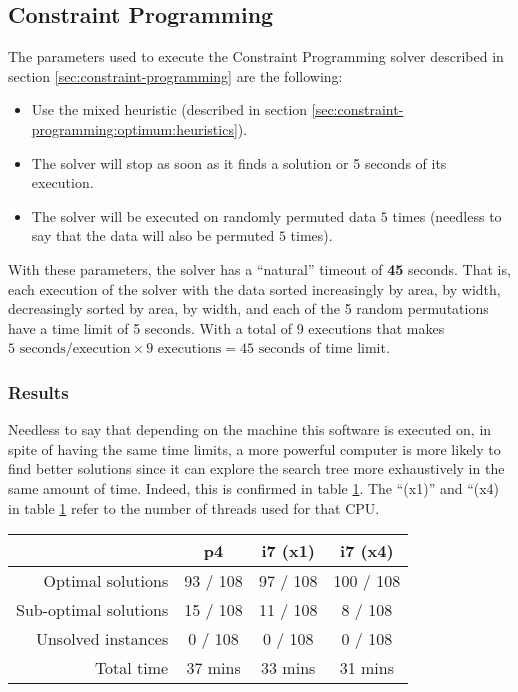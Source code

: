 \subsection{Constraint Programming}
\label{sec:benchmarking:constraint-programming}

The parameters used to execute the Constraint Programming solver described in section
\ref{sec:constraint-programming} are the following:
\begin{itemize}
	\item Use the mixed heuristic (described in section \ref{sec:constraint-programming:optimum:heuristics}).
	\item The solver will stop as soon as it finds a solution or 5 seconds of its execution.
	\item The solver will be executed on randomly permuted data $5$ times (needless to
	say that the data will also be permuted $5$ times).
\end{itemize}

With these parameters, the solver has a ``natural'' timeout of \textbf{45} seconds.
That is, each execution of the solver with the data sorted increasingly by area, by
width, decreasingly sorted by area, by width, and each of the 5 random permutations
have a time limit of 5 seconds. With a total of 9 executions that makes
$5 \text{ seconds/execution} \times 9 \text{ executions} = 45 \text{ seconds}$ of time limit.

\subsubsection{Results}
\label{sec:benchmarking:constraint-programming:results}

Needless to say that depending on the machine this software is executed on,
in spite of having the same time limits, a more powerful computer is more likely
to find better solutions since it can explore the search tree more exhaustively
in the same amount of time. Indeed, this is confirmed in table \ref{table:CP-results}.
The ``(x1)'' and ``(x4) in table \ref{table:CP-results} refer to the number of threads
used for that CPU.

\begin{table}[H]
\centering
	\begin{tabular}{rccc}
								& p4			& i7 (x1)	& i7 (x4) \\
		\midrule
		Optimal solutions		& 93 / 108	& 97 / 108	& 100 / 108 \\
		Sub-optimal solutions	& 15 / 108	& 11 / 108	&   8 / 108 \\
		Unsolved instances		&  0 / 108	&  0 / 108	&   0 / 108 \\
		Total time				& 37 mins	& 33 mins	& 31 mins \\
	\end{tabular}
	\label{table:CP-results}
\end{table}

